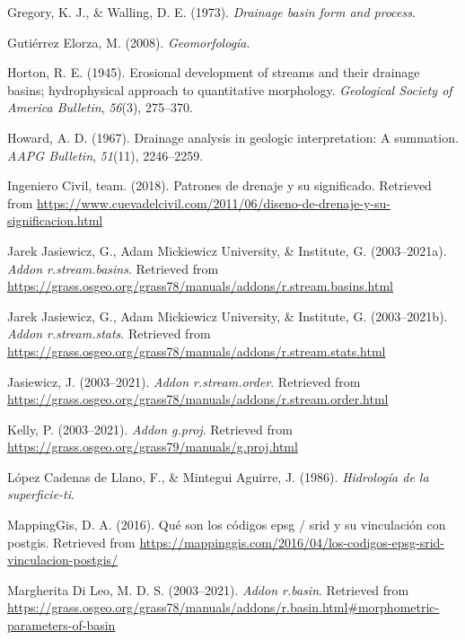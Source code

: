 \documentclass[11pt,]{article}
\begin{document}
\hypertarget{ref-gregory1973drainage}{}
Gregory, K. J., \& Walling, D. E. (1973). \emph{Drainage basin form and
process}.

\hypertarget{ref-gutierrez2008geomorfologia}{}
Gutiérrez Elorza, M. (2008). \emph{Geomorfología}.

\hypertarget{ref-horton1945erosional}{}
Horton, R. E. (1945). Erosional development of streams and their
drainage basins; hydrophysical approach to quantitative morphology.
\emph{Geological Society of America Bulletin}, \emph{56}(3), 275--370.

\hypertarget{ref-howard1967drainage}{}
Howard, A. D. (1967). Drainage analysis in geologic interpretation: A
summation. \emph{AAPG Bulletin}, \emph{51}(11), 2246--2259.

\hypertarget{ref-patron2018}{}
Ingeniero Civil, team. (2018). Patrones de drenaje y su significado.
Retrieved from
\url{https://www.cuevadelcivil.com/2011/06/diseno-de-drenaje-y-su-significacion.html}

\hypertarget{ref-streambasinsjareck}{}
Jarek Jasiewicz, G., Adam Mickiewicz University, \& Institute, G.
(2003--2021a). \emph{Addon r.stream.basins}. Retrieved from
\url{https://grass.osgeo.org/grass78/manuals/addons/r.stream.basins.html}

\hypertarget{ref-streamstats}{}
Jarek Jasiewicz, G., Adam Mickiewicz University, \& Institute, G.
(2003--2021b). \emph{Addon r.stream.stats}. Retrieved from
\url{https://grass.osgeo.org/grass78/manuals/addons/r.stream.stats.html}

\hypertarget{ref-streamorder}{}
Jasiewicz, J. (2003--2021). \emph{Addon r.stream.order}. Retrieved from
\url{https://grass.osgeo.org/grass78/manuals/addons/r.stream.order.html}

\hypertarget{ref-gproj}{}
Kelly, P. (2003--2021). \emph{Addon g.proj}. Retrieved from
\url{https://grass.osgeo.org/grass79/manuals/g.proj.html}

\hypertarget{ref-lopez1986hidrologia}{}
López Cadenas de Llano, F., \& Mintegui Aguirre, J. (1986).
\emph{Hidrología de la superficie-ti}.

\hypertarget{ref-EPSG}{}
MappingGis, D. A. (2016). Qué son los códigos epsg / srid y su
vinculación con postgis. Retrieved from
\url{https://mappinggis.com/2016/04/los-codigos-epsg-srid-vinculacion-postgis/}

\hypertarget{ref-basinmargherita}{}
Margherita Di Leo, M. D. S. (2003--2021). \emph{Addon r.basin}.
Retrieved from
\url{https://grass.osgeo.org/grass78/manuals/addons/r.basin.html\#morphometric-parameters-of-basin}
\end{document}
